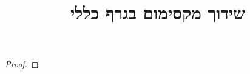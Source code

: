 \documentclass[]{article}
\title{שידוך מקסימום בגרף כללי}
\author{}
\date{}
\begin{document}
\maketitle


\begin{theorem}
\end{theorem}

\begin{proof}
\end{proof}
\end{document}
